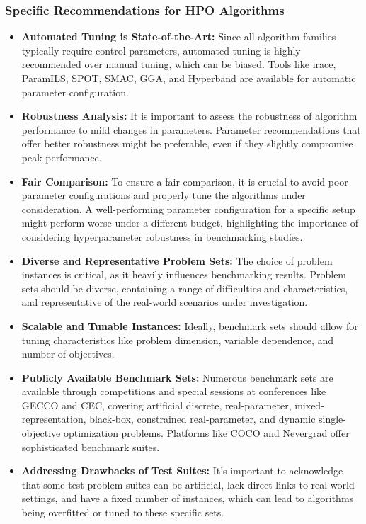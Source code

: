 \subsubsection{Specific Recommendations for HPO Algorithms}


\begin{itemize}[leftmargin=*,itemsep=0.4em]
  \item \textbf{Automated Tuning is State-of-the-Art:} Since all algorithm families typically require control parameters, automated tuning is highly recommended over manual tuning, which can be biased. Tools like irace, ParamILS, SPOT, SMAC, GGA, and Hyperband are available for automatic parameter configuration.
  \item \textbf{Robustness Analysis:} It is important to assess the robustness of algorithm performance to mild changes in parameters. Parameter recommendations that offer better robustness might be preferable, even if they slightly compromise peak performance.
  \item \textbf{Fair Comparison:} To ensure a fair comparison, it is crucial to avoid poor parameter configurations and properly tune the algorithms under consideration. A well-performing parameter configuration for a specific setup might perform worse under a different budget, highlighting the importance of considering hyperparameter robustness in benchmarking studies.
\end{itemize}


\begin{itemize}[leftmargin=*,itemsep=0.4em]
  \item \textbf{Diverse and Representative Problem Sets:} The choice of problem instances is critical, as it heavily influences benchmarking results. Problem sets should be diverse, containing a range of difficulties and characteristics, and representative of the real-world scenarios under investigation.
  \item \textbf{Scalable and Tunable Instances:} Ideally, benchmark sets should allow for tuning characteristics like problem dimension, variable dependence, and number of objectives.
  \item \textbf{Publicly Available Benchmark Sets:} Numerous benchmark sets are available through competitions and special sessions at conferences like GECCO and CEC, covering artificial discrete, real-parameter, mixed-representation, black-box, constrained real-parameter, and dynamic single-objective optimization problems. Platforms like COCO and Nevergrad offer sophisticated benchmark suites.
  \item \textbf{Addressing Drawbacks of Test Suites:} It's important to acknowledge that some test problem suites can be artificial, lack direct links to real-world settings, and have a fixed number of instances, which can lead to algorithms being overfitted or tuned to these specific sets.
\end{itemize}

